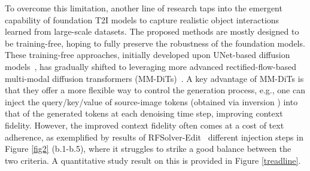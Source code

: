 \documentclass{article}
\begin{document}
To overcome this limitation, another line of research taps into the emergent capability of foundation T2I models to capture realistic object interactions learned from large-scale datasets.
The proposed methods are mostly designed to be training-free, hoping to fully preserve the robustness of the foundation models.
{These training-free approaches, initially developed upon UNet-based diffusion models~\citep{hertz2022prompt, cao2023masactrl, tumanyan2023plug}, has gradually shifted to leveraging more advanced rectified-flow-based multi-modal diffusion transformers (MM-DiTs)~\citep{rout2024semantic, wang2024taming, deng2024fireflow, tewel2025addit, zhu2025kv}.
A key advantage of MM-DiTs is that they offer a more flexible way to control the generation process, e.g., one can inject the query/key/value of source-image tokens (obtained via inversion \citep{deng2024fireflow,rout2024semantic,wang2024taming}) into that of the generated tokens at each denoising time step, improving context fidelity.}
{However, the improved context fidelity often comes at a cost of text adherence, as exemplified by results of RFSolver-Edit~\citep{wang2024taming} different injection steps in  Figure \ref{fig2} (b.1-b.5), where it struggles to strike a good balance between the two criteria. A quantitative study result on this is provided in Figure \ref{treadline}.}
\end{document}
